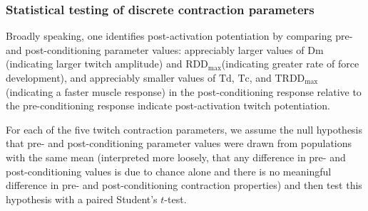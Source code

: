 \documentclass[utf8]{FrontiersinHarvard}
\newcommand{\Dm}{\ensuremath{\text{Dm}}\xspace}
\newcommand{\Td}{\ensuremath{\text{Td}}\xspace}
\newcommand{\Tc}{\ensuremath{\text{Tc}}\xspace}
\newcommand{\RDDMax}{\ensuremath{ \text{RDD}_{\text{max}}}\xspace}
\newcommand{\RDDMaxTime}{\ensuremath{ \text{TRDD}_{\text{max}}}\xspace}
\begin{document}
\subsubsection{Statistical testing of discrete contraction parameters} \label{sss:discrete_twitch_param_stats}
Broadly speaking, one identifies post-activation potentiation by comparing pre- and post-conditioning parameter values:
appreciably larger values of \Dm (indicating larger twitch amplitude) and \RDDMax (indicating greater rate of force development), and appreciably smaller values of \Td, \Tc, and \RDDMaxTime (indicating a faster muscle response) in the post-conditioning response relative to the pre-conditioning response indicate post-activation twitch potentiation.

For each of the five twitch contraction parameters, we assume the null hypothesis that pre- and post-conditioning parameter values were drawn from populations with the same mean
(interpreted more loosely, that any difference in pre- and post-conditioning values is due to chance alone and there is no meaningful difference in pre- and post-conditioning contraction properties)
and then test this hypothesis with a paired Student's $ t $-test.
\end{document}
